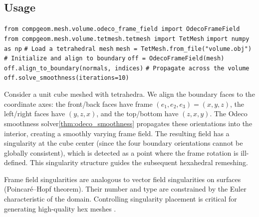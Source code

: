 \subsection{Usage}
\begin{algorithm}
\caption{Odeco Frame Field Design\label{alg:odeco_frame_field}}
\begin{algorithmic}[1]
\State \texttt{from compgeom.mesh.volume.odeco\_frame\_field import OdecoFrameField}
\State \texttt{from compgeom.mesh.volume.tetmesh.tetmesh import TetMesh}
\State \texttt{import numpy as np}
\Statex
\State \texttt{\# Load a tetrahedral mesh}
\State \texttt{mesh = TetMesh.from\_file("volume.obj")}
\Statex
\State \texttt{\# Initialize and align to boundary}
\State \texttt{off = OdecoFrameField(mesh)}
\State \texttt{off.align\_to\_boundary(normals, indices)}
\Statex
\State \texttt{\# Propagate across the volume}
\State \texttt{off.solve\_smoothness(iterations=10)}
\end{algorithmic}
\end{algorithm}

\begin{example}\label{example:odeco_cube}
Consider a unit cube meshed with tetrahedra. We align the boundary faces to the coordinate axes: the front/back faces have frame $(e_1, e_2, e_3) = (x, y, z)$, the left/right faces have $(y, z, x)$, and the top/bottom have $(z, x, y)$. The Odeco smoothness solver\cref{thm:odeco_smoothness} propagates these orientations into the interior, creating a smoothly varying frame field. The resulting field has a singularity at the cube center (since the four boundary orientations cannot be globally consistent), which is detected as a point where the frame rotation is ill-defined. This singularity structure guides the subsequent hexahedral remeshing.
\end{example}

\begin{remark}
Frame field singularities are analogous to vector field singularities on surfaces (Poincar\'{e}--Hopf theorem). Their number and type are constrained by the Euler characteristic of the domain. Controlling singularity placement is critical for generating high-quality hex meshes \cite{bommes2013}.
\end{remark}

